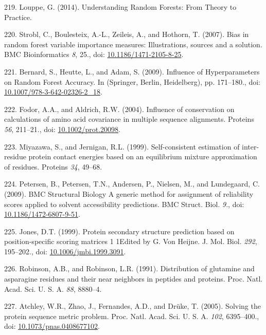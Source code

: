 \documentclass[11pt,a4paper,twoside]{book}
\theoremstyle{definition}
\theoremstyle{definition}
\theoremstyle{remark}
\begin{document}
\hypertarget{ref-Louppe2014}{}
219. Louppe, G. (2014). Understanding Random Forests: From Theory to
Practice.

\hypertarget{ref-Strobl2007}{}
220. Strobl, C., Boulesteix, A.-L., Zeileis, A., and Hothorn, T. (2007).
Bias in random forest variable importance measures: Illustrations,
sources and a solution. BMC Bioinformatics \emph{8}, 25., doi:
\href{https://doi.org/10.1186/1471-2105-8-25}{10.1186/1471-2105-8-25}.

\hypertarget{ref-Bernard2009}{}
221. Bernard, S., Heutte, L., and Adam, S. (2009). Influence of
Hyperparameters on Random Forest Accuracy. In (Springer, Berlin,
Heidelberg), pp. 171--180., doi:
\href{https://doi.org/10.1007/978-3-642-02326-2_18}{10.1007/978-3-642-02326-2\_18}.

\hypertarget{ref-Fodor2004a}{}
222. Fodor, A.A., and Aldrich, R.W. (2004). Influence of conservation on
calculations of amino acid covariance in multiple sequence alignments.
Proteins \emph{56}, 211--21., doi:
\href{https://doi.org/10.1002/prot.20098}{10.1002/prot.20098}.

\hypertarget{ref-Miyazawa1999a}{}
223. Miyazawa, S., and Jernigan, R.L. (1999). Self-consistent estimation
of inter-residue protein contact energies based on an equilibrium
mixture approximation of residues. Proteins \emph{34}, 49--68.

\hypertarget{ref-Petersen2009a}{}
224. Petersen, B., Petersen, T.N., Andersen, P., Nielsen, M., and
Lundegaard, C. (2009). BMC Structural Biology A generic method for
assignment of reliability scores applied to solvent accessibility
predictions. BMC Struct. Biol. \emph{9}., doi:
\href{https://doi.org/10.1186/1472-6807-9-51}{10.1186/1472-6807-9-51}.

\hypertarget{ref-Jones1999}{}
225. Jones, D.T. (1999). Protein secondary structure prediction based on
position-specific scoring matrices 1 1Edited by G. Von Heijne. J. Mol.
Biol. \emph{292}, 195--202., doi:
\href{https://doi.org/10.1006/jmbi.1999.3091}{10.1006/jmbi.1999.3091}.

\hypertarget{ref-Robinson1991}{}
226. Robinson, A.B., and Robinson, L.R. (1991). Distribution of
glutamine and asparagine residues and their near neighbors in peptides
and proteins. Proc. Natl. Acad. Sci. U. S. A. \emph{88}, 8880--4.

\hypertarget{ref-Atchley2005}{}
227. Atchley, W.R., Zhao, J., Fernandes, A.D., and Drüke, T. (2005).
Solving the protein sequence metric problem. Proc. Natl. Acad. Sci. U.
S. A. \emph{102}, 6395--400., doi:
\href{https://doi.org/10.1073/pnas.0408677102}{10.1073/pnas.0408677102}.
\end{document}
